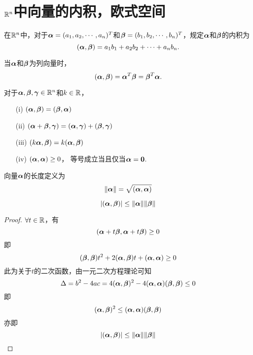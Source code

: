\section{$\R^n$中向量的内积，欧式空间}
\begin{frame}\ft{\secname}
\begin{dingyi}
  在$\R^n$中，对于$\alphabd=(a_1,a_2,\cd,a_n)^T$和$\betabd=(b_1,b_2,\cd,b_n)^T$，规定$\alphabd$和$\betabd$的内积为
  $$
  (\alphabd,\betabd)=a_1b_1+a_2b_2+\cd+a_nb_n.
  $$
\end{dingyi}
当$\alphabd$和$\betabd$为列向量时，
$$
(\alphabd,\betabd)=\alphabd^T\betabd=\betabd^T\alphabd.
$$
\end{frame}

\begin{frame}\ft{\secname}

\begin{xingzhi}[内积的运算性质]
  对于$\alphabd,\betabd,\gammabd\in\R^n$和$k\in\R$，
  \begin{itemize}
  \item[(i)]   $(\alphabd,\betabd)=(\betabd,\alphabd)$
  \item[(ii)]  $(\alphabd+\betabd,\gammabd)=(\alphabd,\gammabd)+(\betabd,\gammabd)$
  \item[(iii)] $(k\alphabd,\betabd)=k(\alphabd,\betabd)$
  \item[(iv)]  $(\alphabd,\alphabd)\ge0$， 等号成立当且仅当$\alphabd=\zero$.
  \end{itemize}
\end{xingzhi}

\end{frame}

\begin{frame}\ft{\secname}

\begin{dingyi}[向量长度]
  向量$\alphabd$的长度定义为
  $$
  \|\alphabd\|=\sqrt{(\alphabd,\alphabd)}
  $$
\end{dingyi}
\end{frame}

\begin{frame}\ft{\secname}

\begin{dingli}
  $$
  |(\alphabd,\betabd)|\le\|\alphabd\|\|\betabd\|
  $$
\end{dingli} \pause 
 
\begin{proof}
$\forall t \in \R$，有
$$
(\alphabd+t\betabd,\alphabd+t\betabd) \ge 0
$$
即
$$
(\betabd,\betabd)t^2+2(\alphabd,\betabd)t+(\alphabd,\alphabd)\ge0
$$
此为关于$t$的二次函数，由一元二次方程理论可知
$$
\Delta = b^2-4ac = 4 (\alphabd,\betabd)^2-4(\alphabd,\alphabd)(\betabd,\betabd)\le 0
$$
即
$$
(\alphabd,\betabd)^2\le (\alphabd,\alphabd)(\betabd,\betabd)
$$
亦即
$$
|(\alphabd,\betabd)|\le\|\alphabd\|\|\betabd\|
$$
\end{proof}

\end{frame}

